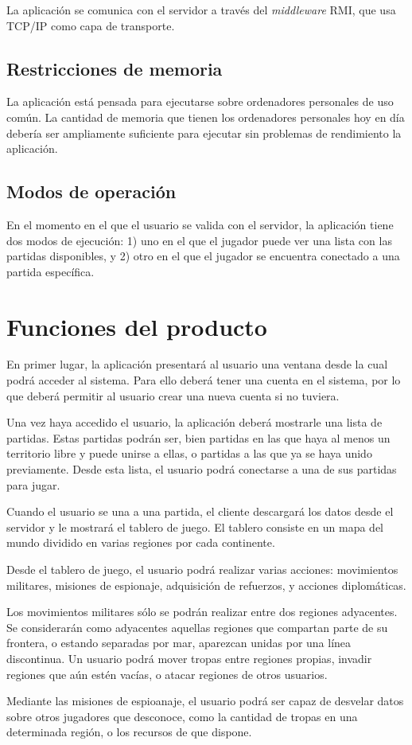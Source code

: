 La aplicación se comunica con el servidor a través del \textit{middleware} RMI,
que usa TCP/IP como capa de transporte.

\subsection{Restricciones de memoria}

La aplicación está pensada para ejecutarse sobre ordenadores personales de uso
común. La cantidad de memoria que tienen los ordenadores personales hoy en día
debería ser ampliamente suficiente para ejecutar sin problemas de rendimiento
la aplicación.

\subsection{Modos de operación}

En el momento en el que el usuario se valida con el servidor, la aplicación
tiene dos modos de ejecución: 1) uno en el que el jugador puede ver una lista
con las partidas disponibles, y 2) otro en el que el jugador se encuentra
conectado a una partida específica.

\section{Funciones del producto}

En primer lugar, la aplicación presentará al usuario una ventana desde la cual
podrá acceder al sistema. Para ello deberá tener una cuenta en el sistema, por
lo que deberá permitir al usuario crear una nueva cuenta si no tuviera.

Una vez haya accedido el usuario, la aplicación deberá mostrarle una lista de
partidas. Estas partidas podrán ser, bien partidas en las que haya al menos un
territorio libre y puede unirse a ellas, o partidas a las que ya se haya unido
previamente. Desde esta lista, el usuario podrá conectarse a una de sus partidas
para jugar.

Cuando el usuario se una a una partida, el cliente descargará los datos desde
el servidor y le mostrará el tablero de juego. El tablero consiste en un mapa
del mundo dividido en varias regiones por cada continente.

Desde el tablero de juego, el usuario podrá realizar varias acciones:
movimientos militares, misiones de espionaje, adquisición de refuerzos, y
acciones diplomáticas.

Los movimientos militares sólo se podrán realizar entre dos regiones
adyacentes. Se considerarán como adyacentes aquellas regiones que compartan
parte de su frontera, o estando separadas por mar, aparezcan unidas por una
línea discontinua. Un usuario podrá mover tropas entre regiones propias,
invadir regiones que aún estén vacías, o atacar regiones de otros usuarios.

Mediante las misiones de espioanaje, el usuario podrá ser capaz de desvelar
datos sobre otros jugadores que desconoce, como la cantidad de tropas en una
determinada región, o los recursos de que dispone.
